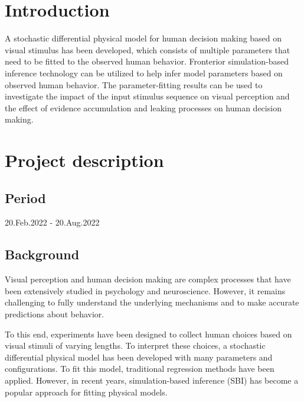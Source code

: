 \section{Introduction}

A stochastic differential physical model for human decision making based on visual stimulus has been developed, which consists of multiple parameters that need to be fitted to the observed human behavior. 
Fronterior simulation-based inference technology can be utilized to help infer model parameters based on observed human behavior.
The parameter-fitting results can be used to investigate the impact of the input stimulus sequence on visual perception and the effect of evidence accumulation and leaking processes on human decision making. 

\section{Project description}
\subsection{Period}
20.Feb.2022 - 20.Aug.2022

\subsection{Background}
Visual perception and human decision making are complex processes that have been extensively studied in psychology and neuroscience. However, it remains challenging to fully understand the underlying mechanisms and to make accurate predictions about behavior. 

To this end, experiments have been designed to collect human choices based on visual stimuli of varying lengths. To interpret these choices, a stochastic differential physical model has been developed with many parameters and configurations. 
To fit this model, traditional regression methods have been applied. 
However, in recent years, simulation-based inference (SBI) has become a popular approach for fitting physical models. 


